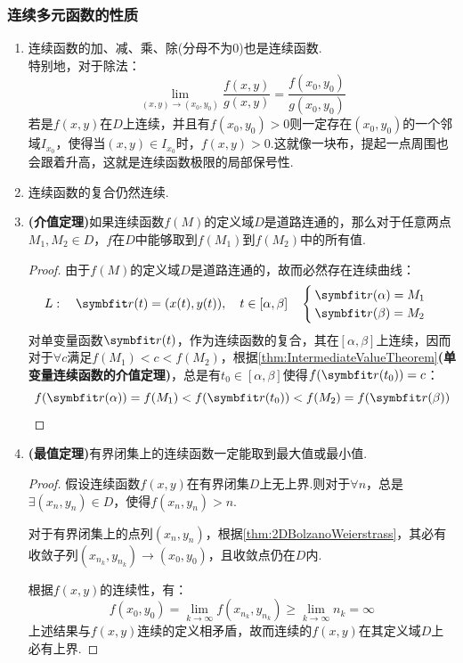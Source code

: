 \subsubsection{连续多元函数的性质}
\begin{enumerate}[property]
    \item 连续函数的加、减、乘、除(分母不为$0$)也是连续函数.\\
    特别地，对于除法：
    \[\lim\limits_{(x,y) \to (x_0,y_0)}\frac{f(x,y)}{g(x,y)} = \frac{f(x_0,y_0)}{g(x_0,y_0)}\]
    若是$f(x,y)$在$D$上连续，并且有$f(x_0,y_0) > 0$则一定存在$(x_0,y_0)$的一个邻域$I_{x_0}$，使得当$(x,y)\in I_{x_0}$时，$f(x,y) > 0$.这就像一块布，提起一点周围也会跟着升高，这就是连续函数极限的局部保号性.
    \item 连续函数的复合仍然连续.
    \item \textbf{(介值定理)}如果连续函数$f(M)$的定义域$D$是道路连通的，那么对于任意两点$M_1,M_2\in D$，$f$在$D$中能够取到$f(M_1)$到$f(M_2)$中的所有值.
    \begin{proof}
        由于$f(M)$的定义域$D$是道路连通的，故而必然存在连续曲线：
        \[L:\quad\vb{r}(t)=(x(t),y(t)),\quad t\in[\alpha,\beta]\quad\begin{cases}
            \vb{r}(\alpha) = M_1\\
            \vb{r}(\beta) = M_2
        \end{cases}\]
        对单变量函数$\vb{r}(t)$，作为连续函数的复合，其在$[\alpha,\beta]$上连续，因而对于$\forall c$满足$f(M_1) < c < f(M_2)$，根据\cref{thm:IntermediateValueTheorem}\textbf{(单变量连续函数的介值定理)}，总是有$t_0\in[\alpha,\beta]$使得$f(\vb{r}(t_0)) = c$：
        \[f(\vb{r}(\alpha)) = f(M_1) < f(\vb{r}(t_0)) < f(M_2) = f(\vb{r}(\beta))\]
    \end{proof}
    \item \textbf{(最值定理)}有界闭集上的连续函数一定能取到最大值或最小值.
    \begin{proof}
        假设连续函数$f(x,y)$在有界闭集$D$上无上界.则对于$\forall n$，总是$\exists (x_n,y_n) \in D$，使得$f(x_n,y_n) > n$.
            
        对于有界闭集上的点列$(x_n,y_n)$，根据\cref{thm:2DBolzanoWeierstrass}，其必有收敛子列$(x_{n_k},y_{n_k}) \to (x_0,y_0)$，且收敛点仍在$D$内.

        根据$f(x,y)$的连续性，有：
        \[f(x_0,y_0) = \lim\limits_{k \to \infty}f(x_{n_k},y_{n_k}) \geqslant \lim\limits_{k \to \infty}n_k = \infty\]
        上述结果与$f(x,y)$连续的定义相矛盾，故而连续的$f(x,y)$在其定义域$D$上必有上界.


\end{proof}
\end{enumerate}
